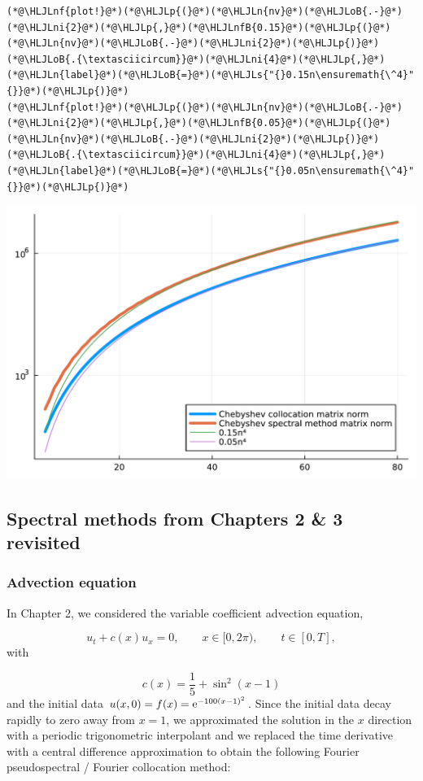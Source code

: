\documentclass[12pt,a4paper]{article}
\newcommand{\HLJLn}[1]{#1}
\newcommand{\HLJLnf}[1]{\textcolor[RGB]{66,102,213}{#1}}
\newcommand{\HLJLs}[1]{\textcolor[RGB]{201,61,57}{#1}}
\newcommand{\HLJLnfB}[1]{\textcolor[RGB]{59,151,46}{#1}}
\newcommand{\HLJLni}[1]{\textcolor[RGB]{59,151,46}{#1}}
\newcommand{\HLJLoB}[1]{\textcolor[RGB]{102,102,102}{\textbf{#1}}}
\newcommand{\HLJLp}[1]{#1}
\begin{document}
\begin{lstlisting}
(*@\HLJLnf{plot!}@*)(*@\HLJLp{(}@*)(*@\HLJLn{nv}@*)(*@\HLJLoB{.-}@*)(*@\HLJLni{2}@*)(*@\HLJLp{,}@*)(*@\HLJLnfB{0.15}@*)(*@\HLJLp{(}@*)(*@\HLJLn{nv}@*)(*@\HLJLoB{.-}@*)(*@\HLJLni{2}@*)(*@\HLJLp{)}@*)(*@\HLJLoB{.{\textasciicircum}}@*)(*@\HLJLni{4}@*)(*@\HLJLp{,}@*)(*@\HLJLn{label}@*)(*@\HLJLoB{=}@*)(*@\HLJLs{"{}0.15n\ensuremath{\^4}"{}}@*)(*@\HLJLp{)}@*)
(*@\HLJLnf{plot!}@*)(*@\HLJLp{(}@*)(*@\HLJLn{nv}@*)(*@\HLJLoB{.-}@*)(*@\HLJLni{2}@*)(*@\HLJLp{,}@*)(*@\HLJLnfB{0.05}@*)(*@\HLJLp{(}@*)(*@\HLJLn{nv}@*)(*@\HLJLoB{.-}@*)(*@\HLJLni{2}@*)(*@\HLJLp{)}@*)(*@\HLJLoB{.{\textasciicircum}}@*)(*@\HLJLni{4}@*)(*@\HLJLp{,}@*)(*@\HLJLn{label}@*)(*@\HLJLoB{=}@*)(*@\HLJLs{"{}0.05n\ensuremath{\^4}"{}}@*)(*@\HLJLp{)}@*)
\end{lstlisting}

\includegraphics[width=\linewidth]{jl_Vz6qXN/Chapter5_60_1.pdf}

\subsection{Spectral methods from Chapters 2 \& 3 revisited}
\subsubsection{Advection equation}
In Chapter 2, we considered the variable coefficient advection equation,

\[
u_t + c(x)u_x = 0, \qquad x \in [0, 2\pi), \qquad t \in [0, T],
\]
with 

\[
c(x) = \frac{1}{5} + \sin^2(x-1)
\]
and the initial data  $u(x,0) = f(x) = {\rm e}^{-100(x-1)^2}$. Since the initial data decay  rapidly to zero away from $x = 1$, we approximated the solution in the $x$ direction with a periodic trigonometric interpolant and we replaced the time derivative with a central difference approximation to obtain the following Fourier pseudospectral / Fourier collocation method:
\end{document}
